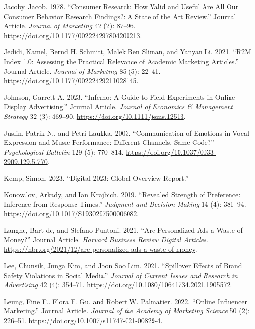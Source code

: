 \documentclass[
  a4paper,
]{scrreprt}
\newlength{\cslhangindent}
\newlength{\cslentryspacingunit} %
\newenvironment{CSLReferences}[2] %
 {%
  \setlength{\parindent}{0pt}
  \ifodd #1
  \let\oldpar\par
  \def\par{\hangindent=\cslhangindent\oldpar}
  \fi
  \setlength{\parskip}{#2\cslentryspacingunit}
 }%
 {}
\begin{document}
\begin{CSLReferences}{1}{0}
\leavevmode{}%
Jacoby, Jacob. 1978. {``Consumer Research: How Valid and Useful Are All
Our Consumer Behavior Research Findings?: A State of the Art Review.''}
Journal Article. \emph{Journal of Marketing} 42 (2): 87--96.
\url{https://doi.org/10.1177/002224297804200213}.

\leavevmode{}%
Jedidi, Kamel, Bernd H. Schmitt, Malek Ben Sliman, and Yanyan Li. 2021.
{``R2M Index 1.0: Assessing the Practical Relevance of Academic
Marketing Articles.''} Journal Article. \emph{Journal of Marketing} 85
(5): 22--41. \url{https://doi.org/10.1177/00222429211028145}.

\leavevmode{}%
Johnson, Garrett A. 2023. {``Inferno: A Guide to Field Experiments in
Online Display Advertising.''} Journal Article. \emph{Journal of
Economics \& Management Strategy} 32 (3): 469--90.
\url{https://doi.org/10.1111/jems.12513}.

\leavevmode{}%
Juslin, Patrik N., and Petri Laukka. 2003. {``Communication of Emotions
in Vocal Expression and Music Performance: Different Channels, Same
Code?''} \emph{Psychological Bulletin} 129 (5): 770--814.
\url{https://doi.org/10.1037/0033-2909.129.5.770}.

\leavevmode{}%
Kemp, Simon. 2023. {``Digital 2023: Global Overview Report.''}

\leavevmode{}%
Konovalov, Arkady, and Ian Krajbich. 2019. {``Revealed Strength of
Preference: Inference from Response Times.''} \emph{Judgment and
Decision Making} 14 (4): 381--94.
\url{https://doi.org/10.1017/S1930297500006082}.

\leavevmode{}%
Langhe, Bart de, and Stefano Puntoni. 2021. {``Are Personalized Ads a
Waste of Money?''} Journal Article. \emph{Harvard Business Review
Digital Articles}.
\url{https://hbr.org/2021/12/are-personalized-ads-a-waste-of-money}.

\leavevmode{}%
Lee, Chunsik, Junga Kim, and Joon Soo Lim. 2021. {``Spillover Effects of
Brand Safety Violations in Social Media.''} \emph{Journal of Current
Issues and Research in Advertising} 42 (4): 354--71.
\url{https://doi.org/10.1080/10641734.2021.1905572}.

\leavevmode{}%
Leung, Fine F., Flora F. Gu, and Robert W. Palmatier. 2022. {``Online
Influencer Marketing.''} Journal Article. \emph{Journal of the Academy
of Marketing Science} 50 (2): 226--51.
\url{https://doi.org/10.1007/s11747-021-00829-4}.


\end{CSLReferences}
\end{document}
